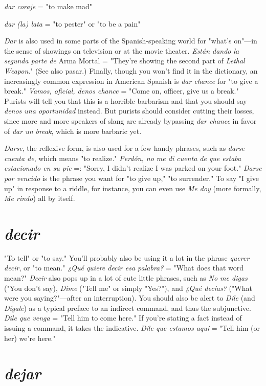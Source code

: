 \documentclass[14pt,a4paper,oneside]{memoir}
\newcommand{\bsk}{\vspace{20pt}}
\newcommand{\indu}{\hspace{20pt}}
\begin{document}
\indu \emph{dar coraje} = "to make mad"

\indu \emph{dar (la) lata} = "to pester" or "to be a pain"

\bsk

\emph{Dar} is also used in some parts of the Spanish-speaking world for
"what's on"---in the sense of showings on television or at the movie
theater. \emph{Están dando la segunda parte de} Arma Mortal = "They're
showing the second part of \emph{Lethal Weapon}." (See also pasar.) Finally,
though you won't find it in the dictionary, an increasingly common expression in American Spanish is \emph{dar chance} for "to give a break." \emph{Vamos, oficial, denos chance} = "Come on, officer, give us a break." Purists will tell you that this is a horrible barbarism and that you should
say \emph{denos una oportunidad} instead. But purists should consider cutting their losses, since more and more speakers of slang are already bypassing \emph{dar chance} in favor of \emph{dar un break}, which is more barbaric yet.

\emph{Darse}, the reflexive form, is also used for a few handy phrases,
such as \emph{darse cuenta de}, which means "to realize." \emph{Perdón, no me di
cuenta de que estaba estacionado en su pie} =: "Sorry, I didn't realize
I was parked on your foot." \emph{Darse por vencido} is the phrase you want
for "to give up," "to surrender." To say "I give up" in response to a
riddle, for instance, you can even use \emph{Me doy} (more formally, \emph{Me rindo}) all by itself.

\section{\emph{decir}}

"To tell" or "to say." You'll probably also be using it a lot in
the phrase \emph{querer decir}, or "to mean." \emph{¿Qué quiere decir esa palabra?}
= "What does that word mean?" \emph{Decir} also pops up in a lot of cute
little phrases, such as \emph{No me digas} ("You don't say), \emph{Dime} ("Tell me"
or simply "Yes?"), and \emph{¿Qué decías?} ("What were you saying?"---after
an interruption). You should also be alert to \emph{Dile} (and \emph{Dígale}) as a typical preface to an indirect command, and thus the subjunctive. \emph{Dile que
venga} = "Tell him to come here." If you're stating a fact instead of
issuing a command, it takes the indicative. \emph{Dile que estamos aquí} =
"Tell him (or her) we're here."

\section{\emph{dejar}}
\end{document}
